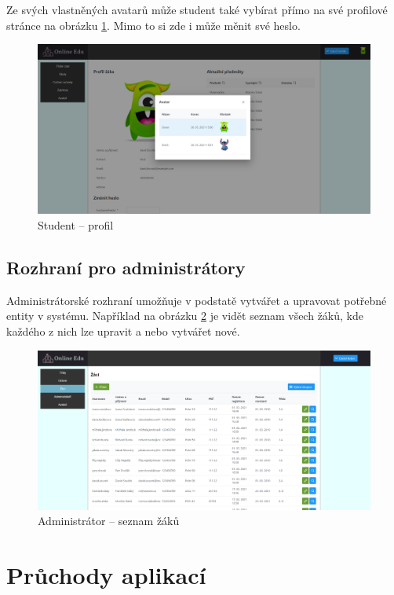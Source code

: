 \documentclass[twoside]{ctuthesis}
\theoremstyle{plain}
\theoremstyle{definition}
\theoremstyle{note}
\begin{document}
Ze svých vlastněných avatarů může student také vybírat přímo na své profilové stránce na obrázku \ref{ref:student-profil}. Mimo to si zde i může měnit své heslo.
\begin{figure}[H]
    \caption{Student -- profil}
    \label{ref:student-profil}
    \centering
    \includegraphics[width=\textwidth]{images/app_screenshots/zak_profil_zmena.png}
\end{figure}

\section{Rozhraní pro administrátory}

Administrátorské rozhraní umožňuje v podstatě vytvářet a upravovat potřebné entity v systému. Například na obrázku \ref{ref:admin-seznam-zaku} je vidět seznam všech žáků, kde každého z nich lze upravit a nebo vytvářet nové.
\begin{figure}[H]
    \caption{Administrátor -- seznam žáků}
    \label{ref:admin-seznam-zaku}
    \centering
    \includegraphics[width=\textwidth]{images/app_screenshots/admin_seznam_zaku}
\end{figure}




\chapter{Průchody aplikací}
\label{chap:prikladne-pruchody}
\end{document}
